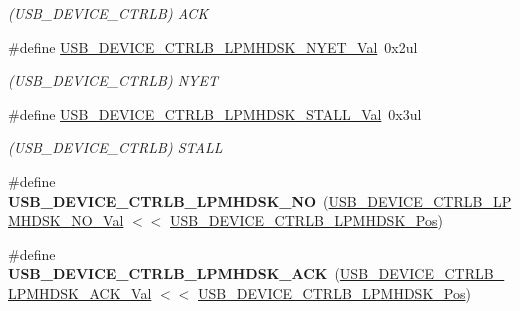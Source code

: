 \begin{DoxyCompactItemize}
\begin{DoxyCompactList}\small\item\em (U\+S\+B\+\_\+\+D\+E\+V\+I\+C\+E\+\_\+\+C\+T\+R\+L\+B) A\+C\+K \end{DoxyCompactList}\item 
\hypertarget{group___s_a_m_l21___u_s_b_ga7f5bfd93b23484ad9c4619c32ebe8389}{}\#define \hyperlink{group___s_a_m_l21___u_s_b_ga7f5bfd93b23484ad9c4619c32ebe8389}{U\+S\+B\+\_\+\+D\+E\+V\+I\+C\+E\+\_\+\+C\+T\+R\+L\+B\+\_\+\+L\+P\+M\+H\+D\+S\+K\+\_\+\+N\+Y\+E\+T\+\_\+\+Val}~0x2ul\label{group___s_a_m_l21___u_s_b_ga7f5bfd93b23484ad9c4619c32ebe8389}

\begin{DoxyCompactList}\small\item\em (U\+S\+B\+\_\+\+D\+E\+V\+I\+C\+E\+\_\+\+C\+T\+R\+L\+B) N\+Y\+E\+T \end{DoxyCompactList}\item 
\hypertarget{group___s_a_m_l21___u_s_b_ga249000ba2e98b6207cbb2176465bf154}{}\#define \hyperlink{group___s_a_m_l21___u_s_b_ga249000ba2e98b6207cbb2176465bf154}{U\+S\+B\+\_\+\+D\+E\+V\+I\+C\+E\+\_\+\+C\+T\+R\+L\+B\+\_\+\+L\+P\+M\+H\+D\+S\+K\+\_\+\+S\+T\+A\+L\+L\+\_\+\+Val}~0x3ul\label{group___s_a_m_l21___u_s_b_ga249000ba2e98b6207cbb2176465bf154}

\begin{DoxyCompactList}\small\item\em (U\+S\+B\+\_\+\+D\+E\+V\+I\+C\+E\+\_\+\+C\+T\+R\+L\+B) S\+T\+A\+L\+L \end{DoxyCompactList}\item 
\hypertarget{group___s_a_m_l21___u_s_b_ga3f9c58708c3f0d2322e7917f6bed2e91}{}\#define {\bfseries U\+S\+B\+\_\+\+D\+E\+V\+I\+C\+E\+\_\+\+C\+T\+R\+L\+B\+\_\+\+L\+P\+M\+H\+D\+S\+K\+\_\+\+N\+O}~(\hyperlink{group___s_a_m_l21___u_s_b_gaead1ace8b3c95e077a583fc16f732901}{U\+S\+B\+\_\+\+D\+E\+V\+I\+C\+E\+\_\+\+C\+T\+R\+L\+B\+\_\+\+L\+P\+M\+H\+D\+S\+K\+\_\+\+N\+O\+\_\+\+Val} $<$$<$ \hyperlink{group___s_a_m_l21___u_s_b_ga7bbe2998f650533b2cc87bb63f7a28de}{U\+S\+B\+\_\+\+D\+E\+V\+I\+C\+E\+\_\+\+C\+T\+R\+L\+B\+\_\+\+L\+P\+M\+H\+D\+S\+K\+\_\+\+Pos})\label{group___s_a_m_l21___u_s_b_ga3f9c58708c3f0d2322e7917f6bed2e91}

\item 
\hypertarget{group___s_a_m_l21___u_s_b_ga15ac3734fd19f8a2006243e60d8f0ad3}{}\#define {\bfseries U\+S\+B\+\_\+\+D\+E\+V\+I\+C\+E\+\_\+\+C\+T\+R\+L\+B\+\_\+\+L\+P\+M\+H\+D\+S\+K\+\_\+\+A\+C\+K}~(\hyperlink{group___s_a_m_l21___u_s_b_ga579aa1294380225d109d6ee2a2d4727d}{U\+S\+B\+\_\+\+D\+E\+V\+I\+C\+E\+\_\+\+C\+T\+R\+L\+B\+\_\+\+L\+P\+M\+H\+D\+S\+K\+\_\+\+A\+C\+K\+\_\+\+Val} $<$$<$ \hyperlink{group___s_a_m_l21___u_s_b_ga7bbe2998f650533b2cc87bb63f7a28de}{U\+S\+B\+\_\+\+D\+E\+V\+I\+C\+E\+\_\+\+C\+T\+R\+L\+B\+\_\+\+L\+P\+M\+H\+D\+S\+K\+\_\+\+Pos})\label{group___s_a_m_l21___u_s_b_ga15ac3734fd19f8a2006243e60d8f0ad3}


\end{DoxyCompactItemize}
